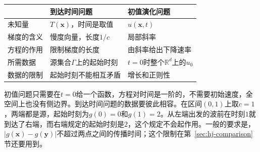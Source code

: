 \begin{BookInlineTable}
  \centering
  \begin{tabular}{lll}
    \toprule
    & 到达时间问题 & 初值演化问题\\
    \midrule
    未知量 & $T(\bm{x})$，时间是取值 & $u(\bm{x},t)$\\
    梯度的含义 & 慢度向量，长度$1/c$ & 局部斜率\\
    方程的作用 & 限制梯度的长度 & 由斜率给出下降速率\\
    所需数据 & 源集合$\Gamma$上的起始时刻 & $t=0$时整个$\mathbb{R}^{d}$上的$u_0$\\
    数据的限制 & 起始时刻不能相互矛盾 & 增长和正则性\\
    \bottomrule
  \end{tabular}
  \caption{到达时间问题与初值演化问题的对比。}
  \label{tab:hj-two-problems}
\end{BookInlineTable}

初值问题只需要在$t=0$给一个函数，方程对时间是一阶的，不需要初始速度，全空间上也没有侧边界。到达时间问题的数据要彼此相容。在区间$(0,1)$上取$c=1$，两端都是源，起始时刻为$g(0)=0$和$g(1)=2$。从左端出发的波前在时刻$1$就到达了右端，而右端规定的起始时刻是$2$，这个规定不会起作用。一般的要求是，$\lvert g(\bm{x})-g(\bm{y})\rvert$不超过两点之间的传播时间；这个限制在第~\ref{sec:hj-comparison}节还要用到。

